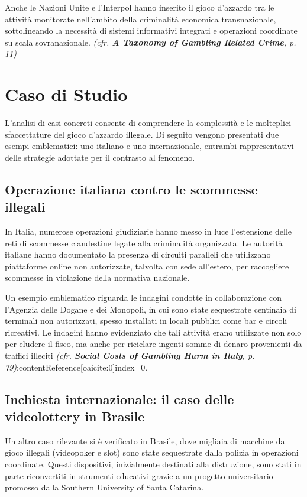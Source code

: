 \documentclass[a4paper,12pt]{article}
\begin{document}
Anche le Nazioni Unite e l’Interpol hanno inserito il gioco d’azzardo tra le attività monitorate nell’ambito della criminalità economica transnazionale, sottolineando la necessità di sistemi informativi integrati e operazioni coordinate su scala sovranazionale. \textit{(cfr. \textbf{A Taxonomy of Gambling Related Crime}, p. 11)} \cite{banks2018taxonomy}

\section{Caso di Studio}

L’analisi di casi concreti consente di comprendere la complessità e le molteplici sfaccettature del gioco d’azzardo illegale. Di seguito vengono presentati due esempi emblematici: uno italiano e uno internazionale, entrambi rappresentativi delle strategie adottate per il contrasto al fenomeno.

\subsection{Operazione italiana contro le scommesse illegali}

In Italia, numerose operazioni giudiziarie hanno messo in luce l’estensione delle reti di scommesse clandestine legate alla criminalità organizzata. Le autorità italiane hanno documentato la presenza di circuiti paralleli che utilizzano piattaforme online non autorizzate, talvolta con sede all’estero, per raccogliere scommesse in violazione della normativa nazionale.

Un esempio emblematico riguarda le indagini condotte in collaborazione con l’Agenzia delle Dogane e dei Monopoli, in cui sono state sequestrate centinaia di terminali non autorizzati, spesso installati in locali pubblici come bar e circoli ricreativi. Le indagini hanno evidenziato che tali attività erano utilizzate non solo per eludere il fisco, ma anche per riciclare ingenti somme di denaro provenienti da traffici illeciti \textit{(cfr. \textbf{Social Costs of Gambling Harm in Italy}, p. 79)}:contentReference[oaicite:0]{index=0}.

\subsection{Inchiesta internazionale: il caso delle videolottery in Brasile}

Un altro caso rilevante si è verificato in Brasile, dove migliaia di macchine da gioco illegali (videopoker e slot) sono state sequestrate dalla polizia in operazioni coordinate. Questi dispositivi, inizialmente destinati alla distruzione, sono stati in parte riconvertiti in strumenti educativi grazie a un progetto universitario promosso dalla Southern University of Santa Catarina.
\end{document}
